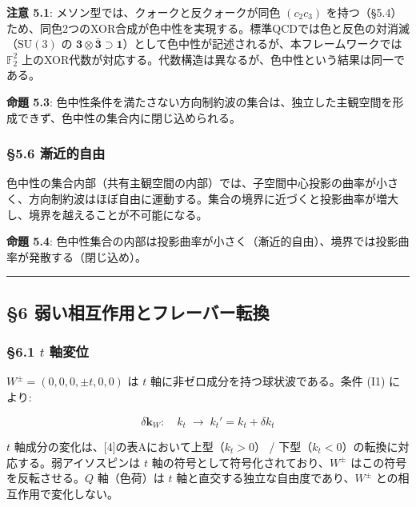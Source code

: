 \documentclass[
  a4paper,11pt]{ltjsarticle}
\theoremstyle{definition}
\theoremstyle{remark}
\begin{document}
\textbf{注意 5.1}: メソン型では、クォークと反クォークが同色
\((c_2 c_3)\)
を持つ（§5.4）ため、同色2つのXOR合成が色中性を実現する。標準QCDでは色と反色の対消滅（\(\mathrm{SU}(3)\)
の
\(\mathbf{3} \otimes \bar{\mathbf{3}} \supset \mathbf{1}\)）として色中性が記述されるが、本フレームワークでは
\(\mathbb{F}_2^2\)
上のXOR代数が対応する。代数構造は異なるが、色中性という結果は同一である。

\textbf{命題 5.3}:
色中性条件を満たさない方向制約波の集合は、独立した主観空間を形成できず、色中性の集合内に閉じ込められる。

\subsubsection{§5.6 漸近的自由}\label{ux6f38ux8fd1ux7684ux81eaux7531}

色中性の集合内部（共有主観空間の内部）では、子空間中心投影の曲率が小さく、方向制約波はほぼ自由に運動する。集合の境界に近づくと投影曲率が増大し、境界を越えることが不可能になる。

\textbf{命題 5.4}:
色中性集合の内部は投影曲率が小さく（漸近的自由）、境界では投影曲率が発散する（閉じ込め）。

\begin{center}\rule{0.5\linewidth}{0.5pt}\end{center}

\subsection{§6
弱い相互作用とフレーバー転換}\label{ux5f31ux3044ux76f8ux4e92ux4f5cux7528ux3068ux30d5ux30ecux30fcux30d0ux30fcux8ee2ux63db}

\subsubsection{\texorpdfstring{§6.1 \(t\)
軸変位}{§6.1 t 軸変位}}\label{t-ux8ef8ux5909ux4f4d}

\(W^{\pm} = (0, 0, 0, \pm t, 0, 0)\) は \(t\)
軸に非ゼロ成分を持つ球状波である。条件 (I1) により:

\[\delta\mathbf{k}_W: \quad k_t \;\longrightarrow\; k_t' = k_t + \delta k_t\]

\(t\) 軸成分の変化は、{[}4{]}の表Aにおいて上型（\(k_t > 0\)） /
下型（\(k_t < 0\)）の転換に対応する。弱アイソスピンは \(t\)
軸の符号として符号化されており、\(W^{\pm}\)
はこの符号を反転させる。\(Q\) 軸（色荷）は \(t\)
軸と直交する独立な自由度であり、\(W^{\pm}\) との相互作用で変化しない。
\end{document}
